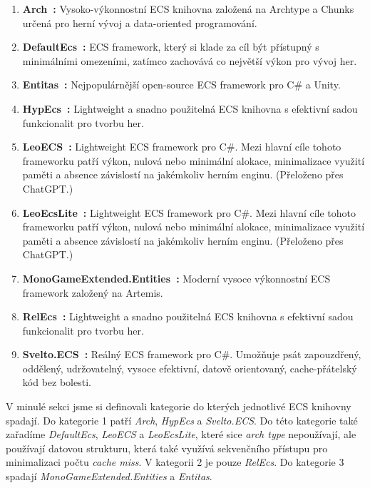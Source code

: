 \begin{enumerate}
    \item \textbf{Arch~\cite{Arch}:} Vysoko-výkonnostní ECS knihovna založená na Archtype a Chunks určená pro herní vývoj a data-oriented programování.
    \item \textbf{DefaultEcs~\cite{DefaultEcs}:} ECS framework, který si klade za cíl být přístupný s minimálními omezeními, zatímco zachovává co největší výkon pro vývoj her.
    \item \textbf{Entitas~\cite{Entitas}:} Nejpopulárnější open-source ECS framework pro C\# a Unity.
    \item \textbf{HypEcs~\cite{HypEcs}:} Lightweight a snadno použitelná ECS knihovna s efektivní sadou funkcionalit pro tvorbu her.
    \item \textbf{LeoECS~\cite{LeoECS}:} Lightweight ECS framework pro C\#. Mezi hlavní cíle tohoto frameworku patří výkon, nulová nebo minimální alokace, minimalizace využití paměti a absence závislostí na jakémkoliv herním enginu. (Přeloženo přes ChatGPT.)
    \item \textbf{LeoEcsLite~\cite{LeoEcsLite}:} Lightweight ECS framework pro C\#. Mezi hlavní cíle tohoto frameworku patří výkon, nulová nebo minimální alokace, minimalizace využití paměti a absence závislostí na jakémkoliv herním enginu. (Přeloženo přes ChatGPT.)
    \item \textbf{MonoGameExtended.Entities~\cite{MonoGameExtended}:} Moderní vysoce výkonnostní ECS framework založený na Artemis.
    \item \textbf{RelEcs~\cite{RelEcs}:} Lightweight a snadno použitelná ECS knihovna s efektivní sadou funkcionalit pro tvorbu her.
    \item \textbf{Svelto.ECS~\cite{SveltoECS}:} Reálný ECS framework pro C\#. Umožňuje psát zapouzdřený, oddělený, udržovatelný, vysoce efektivní, datově orientovaný, cache-přátelský kód bez bolesti.
\end{enumerate}

V minulé sekci jsme si definovali kategorie do kterých jednotlivé ECS knihovny spadají. Do kategorie 1 patří \textit{Arch}, \textit{HypEcs} a \textit{Svelto.ECS}. Do této kategorie také zařadíme \textit{DefaultEcs}, \textit{LeoECS} a \textit{LeoEcsLite}, které sice \textit{arch type} nepoužívají, ale používají datovou strukturu, která také využívá sekvenčního přístupu pro minimalizaci počtu \textit{cache miss}. V kategorii 2 je pouze \textit{RelEcs}. Do kategorie 3 spadají \textit{MonoGameExtended.Entities} a \textit{Entitas}.

